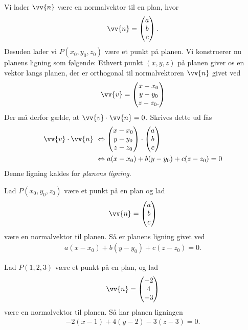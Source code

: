 Vi lader $\vv{n}$ være en normalvektor til en plan, hvor 
\begin{align*}
	\vv{n} = 
	\begin{pmatrix}
		a \\ b \\ c
	\end{pmatrix}.
\end{align*}
Desuden lader vi $P(x_0,y_0,z_0)$ være et punkt på planen. Vi konstruerer nu planens ligning som følgende: Ethvert punkt $(x,y,z)$ på planen giver os en vektor langs planen, der  er orthogonal til normalvektoren $\vv{n}$ givet ved
\begin{align*}
	\vv{v} = 
	\begin{pmatrix}
		x-x_0 \\ y-y_0 \\ z-z_0.
	\end{pmatrix}
\end{align*}
Der må derfor gælde, at $\vv{v}\cdot \vv{n} = 0$. Skrives dette ud fås 
\begin{align*}
	\vv{v} \cdot \vv{n}\  &\Leftrightarrow 
	\begin{pmatrix}
		x-x_0 \\ y-y_0 \\ z-z_0
	\end{pmatrix} \cdot 
	\begin{pmatrix}
		a \\ b \\ c
	\end{pmatrix}\ \\
	 &\Leftrightarrow  a(x-x_0) + b(y-y_0) + c(z-z_0) = 0
\end{align*}
Denne ligning kaldes for \textit{planens ligning}.
\begin{setn}
	Lad $P(x_0,y_0,z_0)$ være et punkt på en plan og lad 
	\begin{align*}
		\vv{n} = 
		\begin{pmatrix}
			a \\ b \\ c
		\end{pmatrix}
	\end{align*}
	være en normalvektor til planen. Så er planens ligning givet ved
	\begin{align*}
		a(x-x_0)+b(y-y_0)+c(z-z_0)=0.
	\end{align*}
\end{setn}
\begin{exa}
Lad $P(1,2,3)$ være et punkt på en plan, og lad
\begin{align*}
	\vv{n} = 
	\begin{pmatrix}
		-2\\ 4\\ -3
	\end{pmatrix}
\end{align*}
være en normalvektor til planen. Så har planen ligningen
\begin{align*}
	-2(x-1)+4(y-2)-3(z-3) = 0.
\end{align*}
\end{exa}
